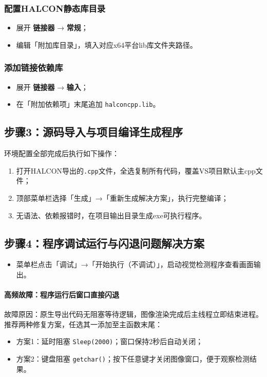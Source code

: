 \documentclass[UTF8,a4paper,12pt]{ctexart}
\begin{document}
\subsubsection{配置HALCON静态库目录}
\begin{itemize}
    \item 展开 \textbf{链接器} → \textbf{常规}；
    \item 编辑「附加库目录」，填入对应x64平台lib库文件夹路径。
\end{itemize}

\subsubsection{添加链接依赖库}
\begin{itemize}
    \item 展开 \textbf{链接器} → \textbf{输入}；
    \item 在「附加依赖项」末尾追加 \texttt{halconcpp.lib}。
\end{itemize}

\subsection{步骤3：源码导入与项目编译生成程序}
环境配置全部完成后执行如下操作：
\begin{enumerate}
    \item 打开HALCON导出的\texttt{.cpp}文件，全选复制所有代码，覆盖VS项目默认主cpp文件；
    \item 顶部菜单栏选择「生成」→「重新生成解决方案」，执行完整编译；
    \item 无语法、依赖报错时，在项目输出目录生成exe可执行程序。
\end{enumerate}

\subsection{步骤4：程序调试运行与闪退问题解决方案}
\begin{itemize}
    \item 菜单栏点击「调试」→「开始执行（不调试）」，启动视觉检测程序查看画面输出。
\end{itemize}

\paragraph{高频故障：程序运行后窗口直接闪退}
故障原因：原生导出代码无阻塞等待逻辑，图像渲染完成后主线程立即结束进程。
推荐两种修复方案，任选其一添加至主函数末尾：
\begin{itemize}
    \item 方案1：延时阻塞 \texttt{Sleep(2000)}；窗口保持2秒后自动关闭；
    \item 方案2：键盘阻塞 \texttt{getchar()}；按下任意键才关闭图像窗口，便于观察检测结果。
\end{itemize}
\end{document}
